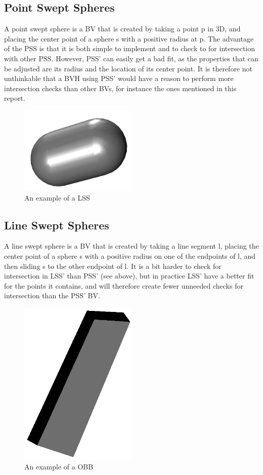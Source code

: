 \subsection{Point Swept Spheres}
A point swept sphere is a BV that is created by taking a point p in 3D, and placing the center point of a sphere s with a positive radius at p. The advantage of the PSS is that it is both simple to implement and to check to for intersection with other PSS. However, PSS' can easily get a bad fit, as the properties that can be adjusted are its radius and the location of its center point. It is therefore not unthinkable that a BVH using PSS' would have a reason to perform more intersection checks than other BVs, for instance the ones mentioned in this report.

\begin{figure}
\centering
\includegraphics[width=0.5\textwidth]{figures/lss}
\caption{\label{lss-example}An example of a LSS}
\end{figure}

\subsection{Line Swept Spheres}
A line swept sphere is a BV that is created by taking a line segment l, placing the center point of a sphere s with a positive radius on one of the endpoints of l, and then sliding s to the other endpoint of l. It is a bit harder to check for intersection in LSS' than PSS' (see above), but in practice LSS' have a better fit for the points it contains, and will therefore create fewer unneeded checks for intersection than the PSS' BV.

\begin{figure}
\centering
\includegraphics[width=0.5\textwidth]{figures/obb}
\caption{\label{obb-example}An example of a OBB}
\end{figure}

